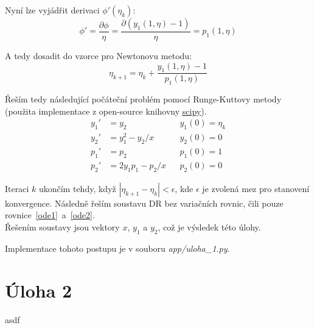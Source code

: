 \documentclass[a4paper,12pt]{article}
\begin{document}
Nyní lze vyjádřit derivaci $\phi'(\eta_k)$:
\begin{equation}
	\phi' = \frac{\partial \phi}{\eta} = \frac{\partial (y_1(1, \eta) - 1)}{\eta} = p_1(1, \eta)
\end{equation}

A tedy dosadit do vzorce pro Newtonovu metodu:
\begin{equation}
	\eta_{k+1} = \eta_{k} + \frac{y_1(1, \eta) - 1}{p_1(1, \eta)}
\end{equation}

Řeším tedy následující počáteční problém pomocí Runge-Kuttovy metody (použita implementace z open-source knihovny \textcolor{blue}{\underline{\href{https://scipy.org/}{scipy}}}).
\begin{align}
\label{ode1}
	y_1' &= y_2 &&
	y_1(0) = \eta_k
	\\
\label{ode2}
	y_2' &= y_1^2 - y_2 / x &&
	y_2(0) = 0
	\\
	p_1' &= p_2 &&
	p_1(0) = 1
	\\
	p_2' &= 2 y_1 p_1 - p_2 / x &&
	p_2(0) = 0
\end{align}

Iteraci $k$ ukončím tehdy, když $|\eta_{k+1} - \eta_{k}| < \epsilon$, kde $\epsilon$ je zvolená mez pro stanovení konvergence.
Následně řeším soustavu DR bez variačních rovnic, čili pouze rovnice~\ref{ode1}~a~\ref{ode2}. \\
Řešením soustavy jsou vektory $x$, $y_1$ a $y_2$, což je výsledek této úlohy.

Implementace tohoto postupu je v souboru \textit{app/uloha\_1.py}.

\newpage
\section*{Úloha 2}
asdf
\end{document}
